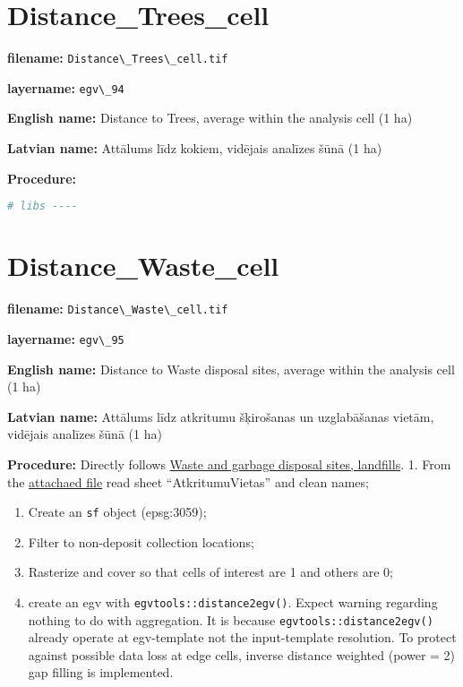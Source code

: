 \documentclass[
]{book}
\newcommand{\passthrough}[1]{#1}
\begin{document}
\section{Distance\_Trees\_cell}\label{ch06.094}

\textbf{filename:} \passthrough{\lstinline!Distance\_Trees\_cell.tif!}

\textbf{layername:} \passthrough{\lstinline!egv\_94!}

\textbf{English name:} Distance to Trees, average within the analysis cell (1 ha)

\textbf{Latvian name:} Attālums līdz kokiem, vidējais analīzes šūnā (1 ha)

\textbf{Procedure:}

\begin{lstlisting}[language=R]
# libs ----
\end{lstlisting}

\section{Distance\_Waste\_cell}\label{ch06.095}

\textbf{filename:} \passthrough{\lstinline!Distance\_Waste\_cell.tif!}

\textbf{layername:} \passthrough{\lstinline!egv\_95!}

\textbf{English name:} Distance to Waste disposal sites, average within the analysis cell (1 ha)

\textbf{Latvian name:} Attālums līdz atkritumu šķirošanas un uzglabāšanas vietām, vidējais analīzes šūnā (1 ha)

\textbf{Procedure:} Directly follows \hyperref[Ch04.14]{Waste and garbage disposal sites, landfills}.
1. From the \href{https://github.com/aavotins/HiQBioDiv_EGVs/blob/main/Data/Geodata/2024/GarbageWasteLandfills/Atkritumi.xlsx}{attachaed file} read sheet ``AtkritumuVietas'' and clean names;

\begin{enumerate}
\def\labelenumi{\arabic{enumi}.}
\setcounter{enumi}{1}
\item
  Create an \passthrough{\lstinline!sf!} object (epsg:3059);
\item
  Filter to non-deposit collection locations;
\item
  Rasterize and cover so that cells of interest are 1 and others are 0;
\item
  create an egv with \passthrough{\lstinline!egvtools::distance2egv()!}. Expect warning regarding nothing
  to do with aggregation. It is because \passthrough{\lstinline!egvtools::distance2egv()!} already operate at
  egv-template not the input-template resolution. To protect against possible data loss at edge cells,
  inverse distance weighted (power = 2) gap filling is implemented.
\end{enumerate}
\end{document}
